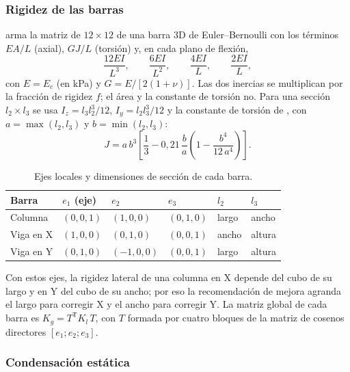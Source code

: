 \subsubsection{Rigidez de las barras}

 arma la matriz de $12 \times 12$ de una barra 3D de Euler--Bernoulli con los términos
$EA/L$ (axial), $GJ/L$ (torsión) y, en cada plano de flexión,
\begin{equation}
	\frac{12EI}{L^3}, \qquad \frac{6EI}{L^2}, \qquad \frac{4EI}{L}, \qquad \frac{2EI}{L},
	\label{eq:sis-flexion}
\end{equation}
con $E = E_c$ (en kPa) y $G = E / [2(1 + \nu)]$. Las dos inercias se multiplican por la fracción de rigidez $f$; el área
y la constante de torsión no. Para una sección $l_2 \times l_3$ se usa $I_z = l_3 l_2^3/12$, $I_y = l_2 l_3^3/12$ y la
constante de torsión de , con $a = \max(l_2, l_3)$ y $b = \min(l_2, l_3)$:
\begin{equation}
	J = a\,b^3 \left[\frac{1}{3} - 0{,}21\,\frac{b}{a}\left(1 - \frac{b^4}{12\,a^4}\right)\right] .
	\label{eq:sis-torsion}
\end{equation}

\begin{table}[H]
	\centering
	\begin{tabular}{L{2.2cm}L{2.1cm}L{2.1cm}L{2.1cm}L{1.5cm}L{1.5cm}}
		\hline
		\textbf{Barra} & \textbf{$e_1$ (eje)} & \textbf{$e_2$} & \textbf{$e_3$} & \textbf{$l_2$} & \textbf{$l_3$} \\ \hline
		Columna & $(0, 0, 1)$ & $(1, 0, 0)$ & $(0, 1, 0)$ & largo & ancho \\
		Viga en X & $(1, 0, 0)$ & $(0, 1, 0)$ & $(0, 0, 1)$ & ancho & altura \\
		Viga en Y & $(0, 1, 0)$ & $(-1, 0, 0)$ & $(0, 0, 1)$ & largo & altura \\ \hline
	\end{tabular}
	\caption{Ejes locales y dimensiones de sección de cada barra.}
	\label{tab:sis-ejes}
\end{table}

Con estos ejes, la rigidez lateral de una columna en X depende del cubo de su largo y en Y del cubo de su ancho; por eso
la recomendación de mejora agranda el largo para corregir X y el ancho para corregir Y. La matriz global de cada barra es
$K_g = T^{\mathsf{T}} K_l\, T$, con $T$ formada por cuatro bloques de la matriz de cosenos directores $[e_1; e_2; e_3]$.

\subsubsection{Condensación estática}

